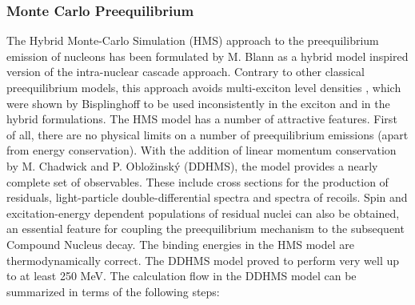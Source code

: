 
\subsubsection{Monte Carlo Preequilibrium\label{DDHMS}}

The Hybrid Monte-Carlo Simulation (HMS) approach to the preequilibrium
emission of nucleons has been formulated by M. Blann \cite{Blann-HMS} as a
hybrid model \cite{hybrid,hybrid1,hybrid2,hybrid3} inspired version of the
intra-nuclear cascade approach. Contrary to other classical preequilibrium
models, this approach avoids multi-exciton level densities%
, which were shown by Bisplinghoff \cite%
{Bisplinghoff} to be used inconsistently in the exciton and in the hybrid
formulations. The HMS%
 model has a number of attractive features. First of all, there
are no physical limits on a number of preequilibrium emissions (apart from
energy conservation). With the addition of linear momentum conservation by
M. Chadwick and P. Oblo\v zinsk\' y (DDHMS), the model provides a nearly
complete set of observables. These include cross sections for the production
of residuals, light-particle double-differential spectra and spectra of
recoils. Spin and excitation-energy dependent populations of residual nuclei
can also be obtained, an essential feature for coupling the preequilibrium
mechanism to the subsequent Compound Nucleus decay. The binding energies in
the HMS%
 model are thermodynamically correct. The DDHMS model proved to
perform very well
up to at least 250 MeV. %
The calculation flow in the DDHMS model can be summarized in terms of the
following steps:

